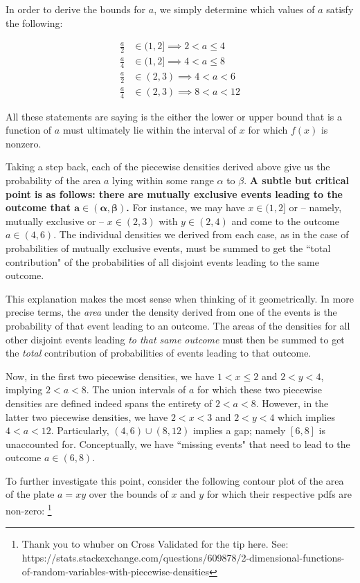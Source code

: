 \documentclass[10pt, oneside]{article}   	%
\theoremstyle{definition}
\begin{document}
\begin{enumerate}[label=6.\arabic*]
In order to derive the bounds for $a$, we simply determine which values of $a$ satisfy the following:

\begin{align*}
\frac{a}{2} &\in (1, 2] \implies 2 < a \leq 4 \\
\frac{a}{4} &\in (1, 2] \implies 4 < a \leq 8 \\
\frac{a}{2} &\in (2,3) \implies 4 < a < 6 \\
\frac{a}{4} &\in (2,3) \implies 8 < a < 12
\end{align*}

All these statements are saying is the either the lower or upper bound that is a function of $a$ must ultimately lie within the interval of $x$ for which $f(x)$ is nonzero.

Taking a step back, each of the piecewise densities derived above give us the probability of the area $a$ lying within some range $\alpha$ to $\beta$. \textbf{A subtle but critical point is as follows: there are mutually exclusive events leading to the outcome that $\bm{a \in (\alpha,\beta)}$.} For instance, we may have $x \in (1,2]$ or -- namely, mutually exclusive or -- $x \in (2,3)$ with $y \in (2,4)$ and come to the outcome $a \in (4,6)$. The individual densities we derived from each case, as in the case of probabilities of mutually exclusive events, must be summed to get the ``total contribution" of the probabilities of all disjoint events leading to the same outcome. 

This explanation makes the most sense when thinking of it geometrically. In more precise terms, the \textit{area} under the density derived from one of the events is the probability of that event leading to an outcome. The areas of the densities for all other disjoint events leading \textit{to that same outcome} must then be summed to get the \textit{total} contribution of probabilities of events leading to that outcome.

Now, in the first two piecewise densities, we have $1 < x \leq 2$ and $2 < y < 4$, implying $2 < a < 8$. The union intervals of $a$ for which these two piecewise densities are defined indeed spans the entirety of $2 < a < 8$. However, in the latter two piecewise densities, we have $2 < x < 3$ and $2 < y < 4$ which implies $4 < a < 12$. Particularly, $(4, 6) \cup (8, 12)$ implies a gap; namely $[6,8]$ is unaccounted for. Conceptually, we have ``missing events" that need to lead to the outcome $a \in (6,8)$. 

To further investigate this point, consider the following contour plot of the area of the plate $a = xy$ over the bounds of $x$ and $y$ for which their respective pdfs are non-zero: \footnote{Thank you to whuber on Cross Validated for the tip here. See: https://stats.stackexchange.com/questions/609878/2-dimensional-functions-of-random-variables-with-piecewise-densities}


\end{enumerate}
\end{document}
